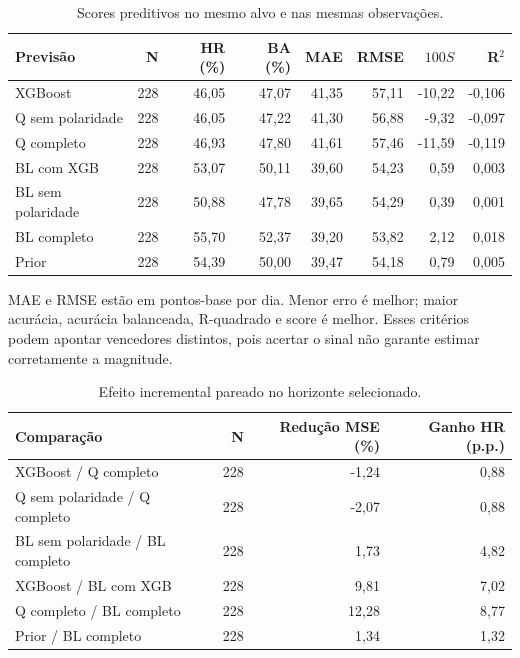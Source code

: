 \begin{table}[H]\centering
\caption{Scores preditivos no mesmo alvo e nas mesmas observações.}
{\footnotesize\begin{tabular}{lrrrrrrr}\hline
Previsão & N & HR (\%) & BA (\%) & MAE & RMSE & $100S$ & R$^2$\\ \hline
XGBoost & 228 & 46,05 & 47,07 & 41,35 & 57,11 & -10,22 & -0,106\\
Q sem polaridade & 228 & 46,05 & 47,22 & 41,30 & 56,88 & -9,32 & -0,097\\
Q completo & 228 & 46,93 & 47,80 & 41,61 & 57,46 & -11,59 & -0,119\\
BL com XGB & 228 & 53,07 & 50,11 & 39,60 & 54,23 & 0,59 & 0,003\\
BL sem polaridade & 228 & 50,88 & 47,78 & 39,65 & 54,29 & 0,39 & 0,001\\
BL completo & 228 & 55,70 & 52,37 & 39,20 & 53,82 & 2,12 & 0,018\\
Prior & 228 & 54,39 & 50,00 & 39,47 & 54,18 & 0,79 & 0,005\\
\hline\end{tabular}}\par{}\end{table}

MAE e RMSE estão em pontos-base por dia. Menor erro é melhor; maior acurácia, acurácia balanceada, R-quadrado e score é melhor. Esses critérios podem apontar vencedores distintos, pois acertar o sinal não garante estimar corretamente a magnitude.

\begin{table}[H]\centering
\caption{Efeito incremental pareado no horizonte selecionado.}
{\footnotesize\begin{tabular}{lrrr}\hline
Comparação & N & Redução MSE (\%) & Ganho HR (p.p.)\\ \hline
XGBoost / Q completo & 228 & -1,24 & 0,88\\
Q sem polaridade / Q completo & 228 & -2,07 & 0,88\\
BL sem polaridade / BL completo & 228 & 1,73 & 4,82\\
XGBoost / BL com XGB & 228 & 9,81 & 7,02\\
Q completo / BL completo & 228 & 12,28 & 8,77\\
Prior / BL completo & 228 & 1,34 & 1,32\\
\hline\end{tabular}}\par{}\end{table}

